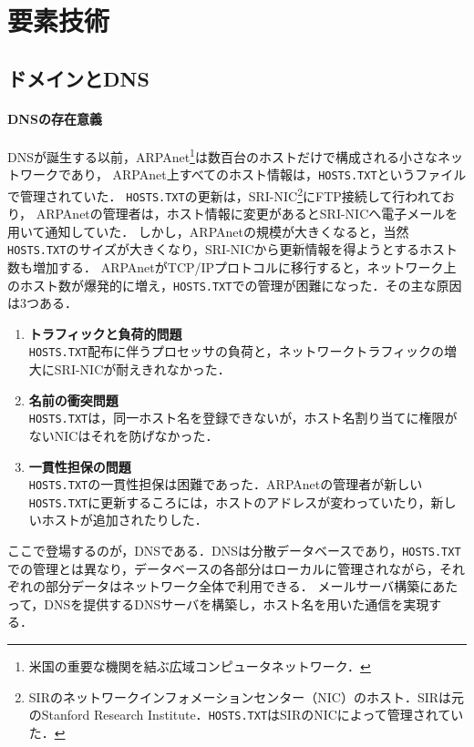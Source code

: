 \section{要素技術}
\subsection{ドメインとDNS}\label{chap:DNS}
\paragraph{DNSの存在意義}
DNSが誕生する以前，ARPAnet\footnote{米国の重要な機関を結ぶ広域コンピュータネットワーク\cite[p.1]{DNSBIND}．}は数百台のホストだけで構成される小さなネットワークであり，
ARPAnet上すべてのホスト情報は，\texttt{HOSTS.TXT}というファイルで管理されていた．
\texttt{HOSTS.TXT}の更新は，SRI-NIC\footnote{SIRのネットワークインフォメーションセンター（NIC）のホスト．SIRは元のStanford Research Institute．\texttt{HOSTS.TXT}はSIRのNICによって管理されていた．}にFTP接続して行われており，
ARPAnetの管理者は，ホスト情報に変更があるとSRI-NICへ電子メールを用いて通知していた．
しかし，ARPAnetの規模が大きくなると，当然\texttt{HOSTS.TXT}のサイズが大きくなり，SRI-NICから更新情報を得ようとするホスト数も増加する\cite[p.3]{DNSBIND}．
ARPAnetがTCP/IPプロトコルに移行すると，ネットワーク上のホスト数が爆発的に増え，\texttt{HOSTS.TXT}での管理が困難になった．その主な原因は3つある．
\begin{enumerate}
    \item \textbf{トラフィックと負荷的問題}\\
          \texttt{HOSTS.TXT}配布に伴うプロセッサの負荷と，ネットワークトラフィックの増大にSRI-NICが耐えきれなかった．
    \item \textbf{名前の衝突問題}\\
          \texttt{HOSTS.TXT}は，同一ホスト名を登録できないが，ホスト名割り当てに権限がないNICはそれを防げなかった．
    \item \textbf{一貫性担保の問題}\\
          \texttt{HOSTS.TXT}の一貫性担保は困難であった．ARPAnetの管理者が新しい\texttt{HOSTS.TXT}に更新するころには，ホストのアドレスが変わっていたり，新しいホストが追加されたりした．
\end{enumerate}
\hfill\cite[p.4]{DNSBIND}\par
ここで登場するのが，DNSである．DNSは分散データベースであり，\texttt{HOSTS.TXT}での管理とは異なり，データベースの各部分はローカルに管理されながら，それぞれの部分データはネットワーク全体で利用できる\cite[p.5]{DNSBIND}．
メールサーバ構築にあたって，DNSを提供するDNSサーバを構築し，ホスト名を用いた通信を実現する．

